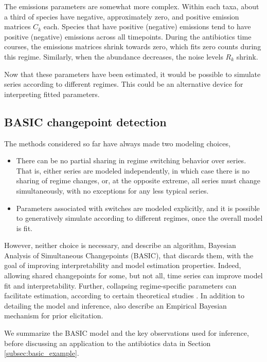\documentclass[14pt]{extarticle}
\begin{document}
The emissions parameters are somewhat more complex. Within each taxa, about a
third of species have negative, approximately zero, and positive emission
matrices $C_{k}$ each. Species that have positive (negative) emissions tend to
have positive (negative) emissions across all timepoints. During the antibiotics
time courses, the emissions matrices shrink towards zero, which fits zero counts
during this regime. Similarly, when the abundance decreases, the noise levels
$R_k$ shrink.

Now that these parameters have been estimated, it would be possible to simulate
series according to different regimes. This could be an alternative device for
interpreting fitted parameters.

\subsection{BASIC changepoint detection}

The methods considered so far have always made two modeling choices,
\begin{itemize}
\item There can be no partial sharing in regime switching behavior over series.
  That is, either series are modeled independently, in which case there is no
  sharing of regime changes, or, at the opposite extreme, all series must change
  simultaneously, with no exceptions for any less typical series.
\item Parameters associated with switches are modeled explicitly, and it is
  possible to generatively simulate according to different regimes, once the
  overall model is fit.
\end{itemize}

However, neither choice is necessary, and \cite{fan2015empirical} describe an
algorithm, Bayesian Analysis of Simultaneous Changepoints (BASIC), that discards
them, with the goal of improving interpretability and model estimation
properties. Indeed, allowing shared changepoints for some, but not all, time
series can improve model fit and interpretability. Further, collapsing
regime-specific parameters can facilitate estimation, according to certain
theoretical studies \citep{liu1994collapsed}. In addition to detailing the model
and inference, \cite{fan2015empirical} also describe an Empirical Bayesian
mechanism for prior elicitation.

We summarize the BASIC model and the key observations used for inference, before
discussing an application to the antibiotics data in Section
\ref{subsec:basic_example}.
\end{document}
